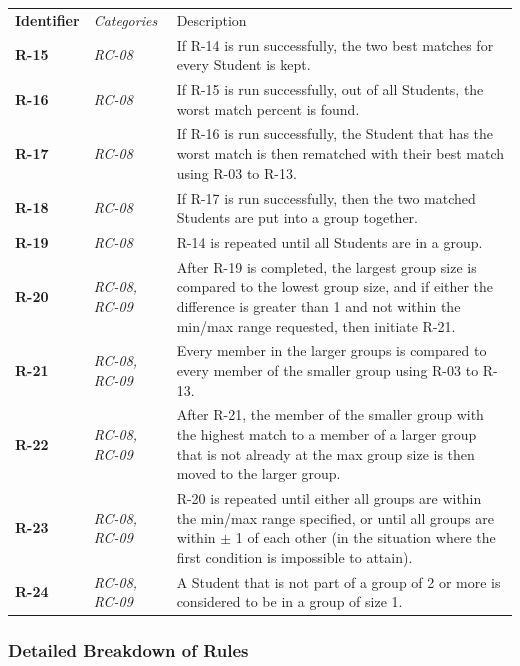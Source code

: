 \documentclass[12pt,letterpaper]{article}
\begin{document}
\begin{center}
    \begin{tabu} to 
	    \tableheader{}Identifier & Categories & Description\\
		R-15 & RC-08 & If R-14 is run successfully, the two best matches for every Student is kept.\\
		R-16 & RC-08 & If R-15 is run successfully, out of all Students, the worst match percent is found.\\
		R-17 & RC-08 & If R-16 is run successfully, the Student that has the worst match is then rematched with their best match using R-03 to R-13.\\
		R-18 & RC-08 & If R-17 is run successfully, then the two matched Students are put into a group together.\\
		R-19 & RC-08 & R-14 is repeated until all Students are in a group.\\
		R-20 & RC-08, RC-09 & After R-19 is completed, the largest group size is compared to the lowest group size, and if either the difference is greater than 1 and not within the min/max range requested, then initiate R-21.\\
		R-21 & RC-08, RC-09 & Every member in the larger groups is compared to every member of the smaller group using R-03 to R-13. \\
		R-22 & RC-08, RC-09 & After R-21, the member of the smaller group with the highest match to a member of a larger group that is not already at the max group size is then moved to the larger group.\\
		R-23 & RC-08, RC-09 & R-20 is repeated until either all groups are within the min/max range specified, or until all groups are within $\pm$ 1 of each other (in the situation where the first condition is impossible to attain).\\
		R-24 & RC-08, RC-09 & A Student that is not part of a group of 2 or more is considered to be in a group of size 1.
    \end{tabu}
\end{center}

\newpage{}

\subsubsection{Detailed Breakdown of Rules}
\end{document}
